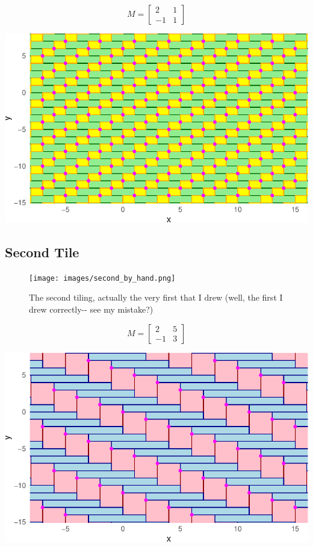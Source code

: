 \documentclass[
  letterpaper,
  DIV=11,
  numbers=noendperiod]{scrreprt}
\begin{document}
\[
M = \begin{bmatrix}2 & 1\\ -1 & 1\end{bmatrix}
\]

\includegraphics{handdrawn_files/figure-pdf/first-1.pdf}

\hypertarget{second-tile}{%
\subsection*{Second Tile}\label{second-tile}}

\begin{figure}

{\centering \texttt{[image: images/second\_by\_hand.png]}

}

\caption{The second tiling, actually the very first that I drew (well,
the first I drew correctly-\/- see my mistake?)}

\end{figure}

\[
M = \begin{bmatrix} 2 & 5\\ -1 & 3\end{bmatrix}
\]

\includegraphics{handdrawn_files/figure-pdf/second-1.pdf}
\end{document}
